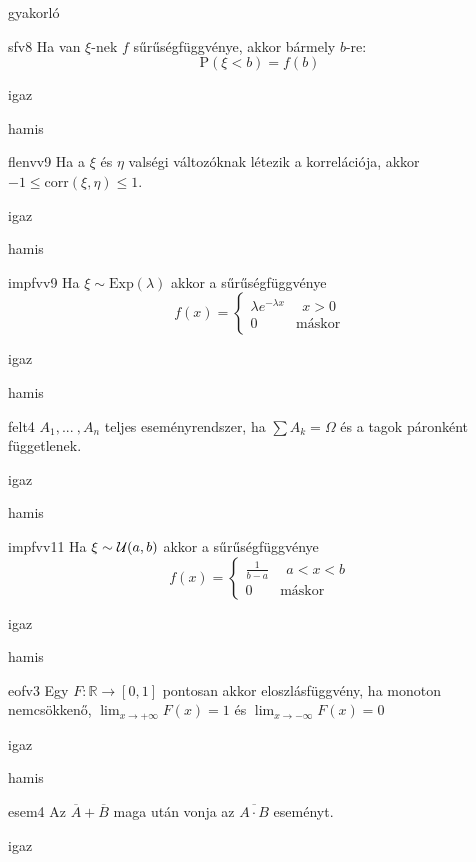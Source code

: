 \documentclass[12pt]{article}
\begin{document}
\begin{quiz}{gyakorló}
\begin{multi}[feedback={Def.}]{sfv8}
Ha van $\xi$-nek $f$ sűrűségfüggvénye, akkor bármely $b$-re:
$$
\mathrm{P}(\xi<b)=f(b)
$$
\item igaz
\item* hamis
\end{multi}
\begin{multi}[feedback={Tulajdonság,tétel.}]{flenvv9}
Ha a $\xi$ és $\eta$ valségi változóknak létezik a korrelációja, akkor $-1\le \mathrm{corr}(\xi,\eta)\le 1$.
\item* igaz
\item hamis
\end{multi}
\begin{multi}[feedback={Def.}]{impfvv9}
Ha $\xi\sim \mathrm{Exp}(\lambda)$ akkor a sűrűségfüggvénye 
$$
f(x)=
\begin{cases}
\lambda e^{-\lambda x}& \ \ x>0\\
0 & \text{máskor} 
\end{cases}
$$
\item* igaz
\item hamis
\end{multi}
\begin{multi}[feedback={Def.}]{felt4}
$A_1,{...\:},A_n$ teljes eseményrendszer, ha $\sum A_k=\Omega$ és a tagok páronként függetlenek.
\item igaz
\item* hamis
\end{multi}
\begin{multi}[feedback={Def.}]{impfvv11}
Ha $\xi\sim {\cal U}(a,b)$ akkor a sűrűségfüggvénye 
$$
f(x)=
\begin{cases}
\frac{1}{b-a} & \ \ a<x<b \\
0 & \text{máskor} 
\end{cases}
$$
\item* igaz
\item hamis
\end{multi}
\begin{multi}[feedback={A balról folytonosság kell.}]{eofv3}
Egy $F:\mathbb{R}\to [0,1]$ pontosan akkor eloszlásfüggvény, ha monoton nemcsökkenő, 
$\lim_{x\to+\infty}F(x)=1$ és $\lim_{x\to-\infty}F(x)=0$
\item igaz
\item* hamis
\end{multi}
\begin{multi}[feedback={de-Morgan azonosság}]{esem4}
Az $\overline{A} + \overline{B}$ maga után vonja az $\overline{A\cdot B}$ eseményt.
\item* igaz

\end{multi}
\end{quiz}
\end{document}
